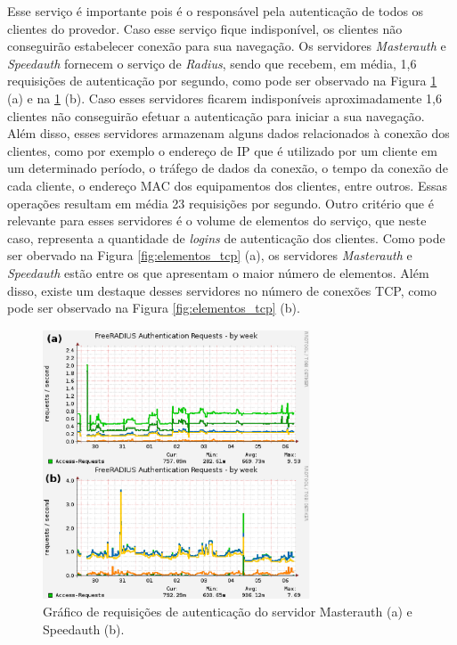 Esse serviço é importante pois é o responsável pela autenticação de todos os clientes do provedor. Caso esse serviço fique indisponível, 
os clientes não conseguirão estabelecer conexão para sua navegação. Os servidores \textit{Masterauth} e \textit{Speedauth} fornecem o serviço de
\textit{Radius}, sendo que recebem, em média, 1,6 requisições de autenticação por segundo, como pode ser observado na Figura 
\ref{fig:freeradius_auth} (a) e na \ref{fig:freeradius_auth} (b). Caso esses servidores ficarem indisponíveis aproximadamente 1,6 clientes 
não conseguirão efetuar a autenticação para iniciar a sua navegação. Além disso, esses servidores armazenam alguns dados relacionados à conexão 
dos clientes, como por exemplo o endereço de \ac{IP} que é utilizado por um cliente em um determinado período, o tráfego de dados da conexão, 
o tempo da conexão de cada cliente, o endereço \ac{MAC} dos equipamentos dos clientes, entre outros. Essas operações resultam em média 23 
requisições por segundo. %
Outro critério que é relevante para esses servidores é o volume de elementos do serviço, que neste caso, representa a quantidade de \textit{logins} 
de autenticação dos clientes. Como pode ser obervado na Figura \ref{fig:elementos_tcp} (a), os servidores \textit{Masterauth} e \textit{Speedauth}
estão entre os que apresentam o maior número de elementos. Além disso, existe um destaque desses servidores no número de conexões \ac{TCP}, como 
pode ser observado na Figura \ref{fig:elementos_tcp} (b).

\begin{figure}[h!]
 \centering
 \includegraphics[width=300px]{img/freeradius_auth.eps}
 \caption{Gráfico de requisições de autenticação do servidor Masterauth (a) e Speedauth (b).}
 \label{fig:freeradius_auth}
\end{figure}

